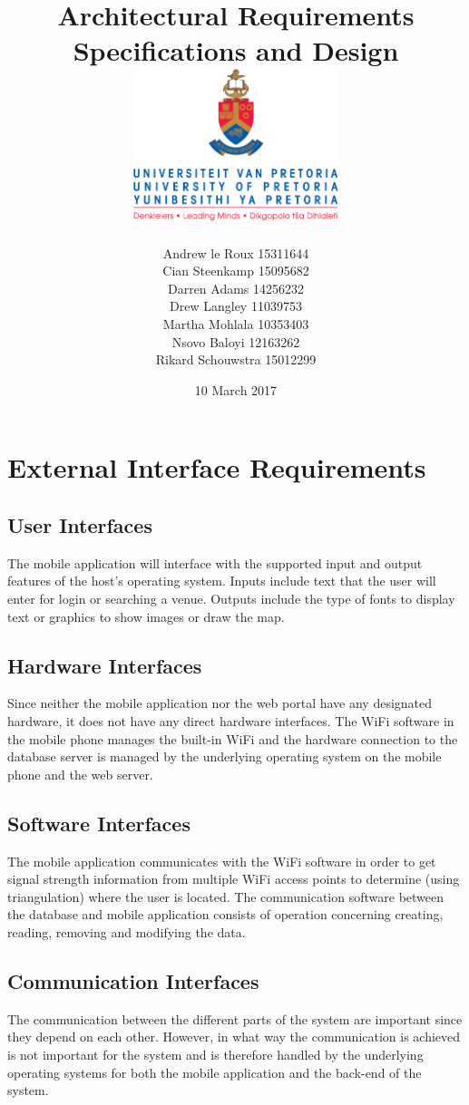 \documentclass{article}
\title{ Architectural Requirements Specifications and Design \\[0.5cm] \includegraphics[width=6cm]{front-page}}
\author{Andrew le Roux \hfill 15311644 \\ Cian Steenkamp \hfill 15095682 \\ Darren Adams \hfill 14256232 \\ Drew Langley \hfill 11039753 \\ Martha Mohlala \hfill 10353403\\ Nsovo Baloyi \hfill 12163262 \\ Rikard Schouwstra \hfill 15012299}
\date{10 March 2017}
\begin{document}
\maketitle
\pagebreak
\tableofcontents
\pagebreak

\section{External Interface Requirements}
    \subsection{User Interfaces}
        The mobile application will interface with the supported input and output
        features of the host's operating system. Inputs include text that the user
        will enter for login or searching a venue. Outputs include the type of fonts
        to display text or graphics to show images or draw the map.

    \subsection{Hardware Interfaces}
        Since neither the mobile application nor the web portal have any designated
        hardware, it does not have any direct hardware interfaces. The WiFi software
        in the mobile phone manages the built-in WiFi and the hardware connection
        to the database server is managed by the underlying operating system on the
        mobile phone and the web server.

    \subsection{Software Interfaces}
        The mobile application communicates with the WiFi software in order to get
        signal strength information from multiple WiFi access points to determine
        (using triangulation) where the user is located. The communication software
        between the database and mobile application consists of operation concerning
        creating, reading, removing and modifying the data.

    \subsection{Communication Interfaces}
        The communication between the different parts of the system are important since they depend on each other. However, in what way the communication is achieved is not important for the system and is therefore handled by the underlying operating systems for both the mobile application and the back-end of the system.
\end{document}
